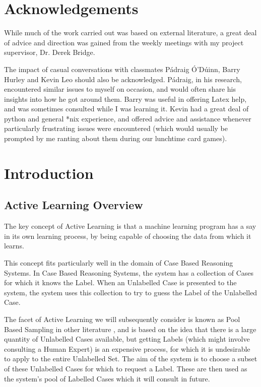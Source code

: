 \documentclass[a4paper,11pt]{report}
\begin{document}
\chapter*{Acknowledgements}
While much of the work carried out was based on external literature, a great deal of advice and direction was gained from the weekly meetings with my project supervisor, Dr. Derek Bridge.

The impact of casual conversations with classmates P\'{a}draig \'{O}'D\'{u}inn, Barry Hurley and Kevin Leo should also be acknowledged. P\'{a}draig, in his research, encountered similar issues to myself on occasion, and would often share his insights into how he got around them. Barry was useful in offering Latex help, and was sometimes consulted while I was learning it. Kevin had a great deal of python and general *nix experience, and offered advice and assistance whenever particularly frustrating issues were encountered (which would usually be prompted by me ranting about them during our lunchtime card games).

\tableofcontents

\chapter{Introduction}
\section{Active Learning Overview}
The key concept of Active Learning is that a machine learning program has a say in its own learning process, by being capable of choosing the data from which it learns. 

This concept fits particularly well in the domain of Case Based Reasoning Systems. In Case Based Reasoning Systems, the system has a collection of Cases for which it knows the Label. When an Unlabelled Case is presented to the system, the system uses this collection to try to guess the Label of the Unlabelled Case.

The facet of Active Learning we will subsequently consider is known as Pool Based Sampling in other literature \citep{Settles2010}, and is based on the idea that there is a large quantity of Unlabelled Cases available, but getting Labels (which might involve consulting a Human Expert) is an expensive process, for which it is undesirable to apply to the entire Unlabelled Set. The aim of the system is to choose a subset of these Unlabelled Cases for which to request a Label. These are then used as the system's pool of Labelled Cases which it will consult in future.
\end{document}
